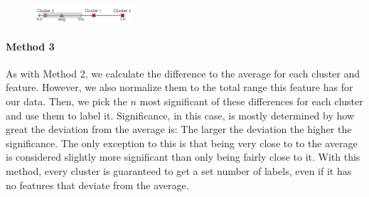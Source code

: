 \begin{figure}[ht]
	\centering
	\includegraphics[width=0.33\textwidth]{images/cluster_labeling_2.pdf}
	\caption{}
	\label{cluster_labeling_2}
\end{figure}

\paragraph{Method 3}
As with Method 2, we calculate the difference to the average for each cluster and feature.
However, we also normalize them to the total range this feature has for our data.
Then, we pick the $n$ most significant of these differences for each cluster and use them to label it.
Significance, in this case, is mostly determined by how great the deviation from the average is: The larger the deviation the higher the significance.
The only exception to this is that being very close to to the average is considered slightly more significant than only being fairly close to it.
With this method, every cluster is guaranteed to get a set number of labels, even if it has no features that deviate from the average.
